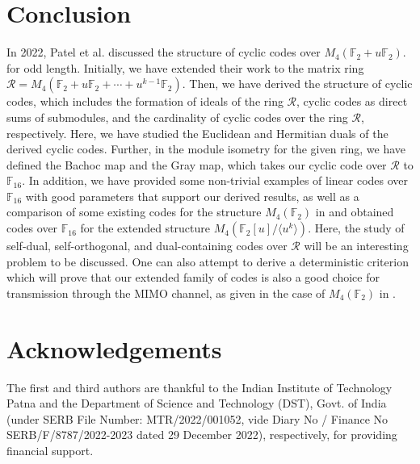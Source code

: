 \documentclass{amsart}
\theoremstyle{definition}
\theoremstyle{remark}
\numberwithin{equation}{section}
\begin{document}
 \section{Conclusion}
In 2022, Patel et al. \cite{s} discussed the structure of cyclic codes over $M_4(\mathbb F_2 + u\mathbb F_2 )$. \cite{s} for odd length. Initially, we have extended their work to the matrix ring $\mathcal{R}= M_4(\mathbb F_2+u\mathbb F_2+\cdots+u^{k-1}\mathbb F_2 )$. Then, we have derived the structure of cyclic codes, which includes the formation of ideals of the ring $\mathcal{R}$, cyclic codes as direct sums of submodules, and the cardinality of cyclic codes over the ring $\mathcal{R}$, respectively. Here, we have studied the Euclidean and Hermitian duals of the derived cyclic codes. Further, in the module isometry for the given ring, we have defined the Bachoc map and the Gray map, which takes our cyclic code over $\mathcal{R}$ to $\mathbb F_{16}$. In addition, we have provided some non-trivial examples of linear codes over $\mathbb F_{16}$ with good parameters that support our derived results, as well as a comparison of some existing codes for the structure $M_4(\mathbb{F}_2)$ in \cite{Pal} and obtained codes over $\mathbb F_{16}$ for the extended structure $M_4 (\mathbb F_2 [u]/ \langle u^k \rangle)$. Here, the study of self-dual, self-orthogonal, and dual-containing codes over $\mathcal{R}$ will be an interesting problem to be discussed. One can also attempt to derive a deterministic criterion which will prove that our extended family of codes is also a good choice for transmission through the MIMO channel, as given in the case of $M_4(\mathbb{F}_2)$ in \cite{F}.
    
    

    \section*{Acknowledgements}
The first and third authors are thankful to the Indian Institute of Technology Patna and the Department of Science and Technology (DST), Govt. of India (under SERB File Number: MTR/2022/001052, vide Diary No / Finance No SERB/F/8787/2022-2023 dated 29 December 2022), respectively, for providing financial support.
\end{document}
